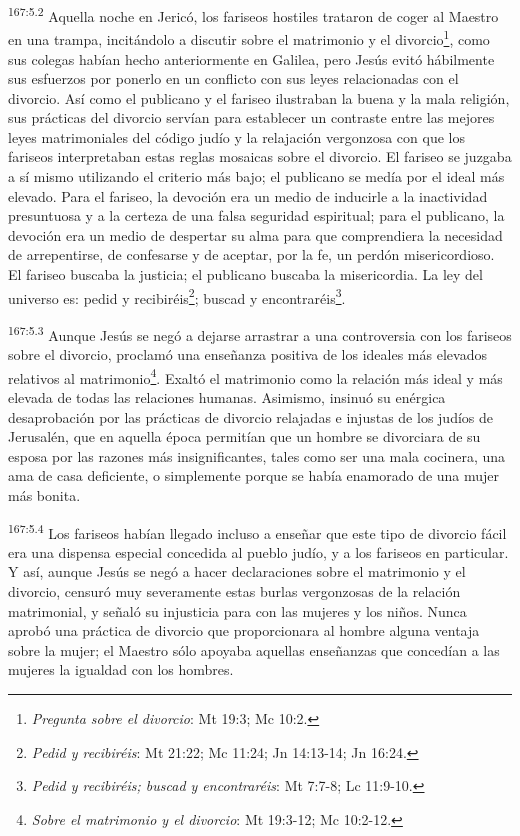 \par
\textsuperscript{167:5.2} Aquella noche en Jericó, los fariseos hostiles trataron de coger al Maestro en una trampa, incitándolo a discutir sobre el matrimonio y el divorcio\footnote{\textit{Pregunta sobre el divorcio}: Mt 19:3; Mc 10:2.}, como sus colegas habían hecho anteriormente en Galilea, pero Jesús evitó hábilmente sus esfuerzos por ponerlo en un conflicto con sus leyes relacionadas con el divorcio. Así como el publicano y el fariseo ilustraban la buena y la mala religión, sus prácticas del divorcio servían para establecer un contraste entre las mejores leyes matrimoniales del código judío y la relajación vergonzosa con que los fariseos interpretaban estas reglas mosaicas sobre el divorcio. El fariseo se juzgaba a sí mismo utilizando el criterio más bajo; el publicano se medía por el ideal más elevado. Para el fariseo, la devoción era un medio de inducirle a la inactividad presuntuosa y a la certeza de una falsa seguridad espiritual; para el publicano, la devoción era un medio de despertar su alma para que comprendiera la necesidad de arrepentirse, de confesarse y de aceptar, por la fe, un perdón misericordioso. El fariseo buscaba la justicia; el publicano buscaba la misericordia. La ley del universo es: pedid y recibiréis\footnote{\textit{Pedid y recibiréis}: Mt 21:22; Mc 11:24; Jn 14:13-14; Jn 16:24.}; buscad y encontraréis\footnote{\textit{Pedid y recibiréis; buscad y encontraréis}: Mt 7:7-8; Lc 11:9-10.}.

\par
\textsuperscript{167:5.3} Aunque Jesús se negó a dejarse arrastrar a una controversia con los fariseos sobre el divorcio, proclamó una enseñanza positiva de los ideales más elevados relativos al matrimonio\footnote{\textit{Sobre el matrimonio y el divorcio}: Mt 19:3-12; Mc 10:2-12.}. Exaltó el matrimonio como la relación más ideal y más elevada de todas las relaciones humanas. Asimismo, insinuó su enérgica desaprobación por las prácticas de divorcio relajadas e injustas de los judíos de Jerusalén, que en aquella época permitían que un hombre se divorciara de su esposa por las razones más insignificantes, tales como ser una mala cocinera, una ama de casa deficiente, o simplemente porque se había enamorado de una mujer más bonita.

\par
\textsuperscript{167:5.4} Los fariseos habían llegado incluso a enseñar que este tipo de divorcio fácil era una dispensa especial concedida al pueblo judío, y a los fariseos en particular. Y así, aunque Jesús se negó a hacer declaraciones sobre el matrimonio y el divorcio, censuró muy severamente estas burlas vergonzosas de la relación matrimonial, y señaló su injusticia para con las mujeres y los niños. Nunca aprobó una práctica de divorcio que proporcionara al hombre alguna ventaja sobre la mujer; el Maestro sólo apoyaba aquellas enseñanzas que concedían a las mujeres la igualdad con los hombres.

